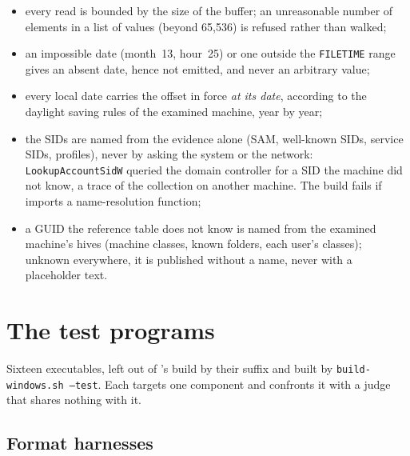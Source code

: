 \documentclass[11pt,a4paper,oneside]{report}
\begin{document}
\begin{itemize}
  \item every read is bounded by the size of the buffer; an unreasonable
    number of elements in a list of values (beyond 65,536) is refused rather
    than walked;
  \item an impossible date (month~13, hour~25) or one outside the
    \texttt{FILETIME} range gives an absent date, hence not emitted, and never
    an arbitrary value;
  \item every local date carries the offset in force \emph{at its date},
    according to the daylight saving rules of the examined machine, year by
    year;
  \item the SIDs are named from the evidence alone (SAM, well-known SIDs,
    service SIDs, profiles), never by asking the system or the network:
    \texttt{LookupAccountSidW} queried the domain controller for a SID the
    machine did not know, a trace of the collection on another machine. The
    build fails if  imports a name-resolution function;
  \item a GUID the reference table does not know is named from the examined
    machine's hives (machine classes, known folders, each user's classes);
    unknown everywhere, it is published without a name, never with a
    placeholder text.
\end{itemize}

\chapter{The test programs}\label{ch:harnais}

Sixteen executables, left out of \wac{}'s build by their
 suffix and built by \texttt{build-windows.sh --test}.
Each targets one component and confronts it with a judge that shares nothing
with it.

\section{Format harnesses}
\end{document}

